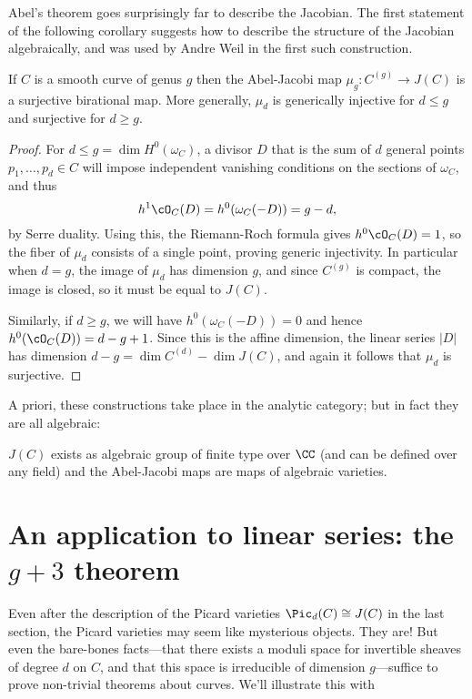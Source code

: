 Abel's theorem goes surprisingly far to describe the Jacobian. The first statement of the following corollary suggests how to describe the structure of the Jacobian algebraically, and was used by Andre Weil in the first such construction.

\begin{corollary}
If $C$ is a smooth curve of genus $g$ then the Abel-Jacobi map $\mu_{g}: C^{(g)} \to J(C)$ is a surjective birational map.
More generally, $\mu_{d}$ is generically injective for $d\leq g$ and surjective for $d\geq g$.
\end{corollary}

\begin{proof}
For $d\leq g = \dim H^{0}(\omega_{C})$,  a divisor $D$ that is the sum of $d$ general points $p_{1}, \dots,  p_{d} \in C$ will impose independent vanishing conditions on the sections of $\omega_{C}$, and thus
$$
h^{1}\cO_{C}(D) = h^0(\omega_C(-D)) = g-d,
$$
by Serre duality. Using this, the Riemann-Roch formula gives $h^{0}\cO_{C}(D) = 1$, so the fiber of 
$\mu_{d}$ consists of a single point, proving generic injectivity. In particular when $d= g$, the image of $\mu_{d}$ has
dimension $g$, and since $C^{(g)}$ is compact, the image is closed, so it must be equal to $J(C)$.

Similarly, if $d \geq g$, we will have $h^0(\omega_C(-D)) = 0$ and hence $h^0(\cO_C(D)) = d-g+1$. Since this is the affine
dimension, the linear series $|D|$ has dimension $d-g = \dim C^{(d)} - \dim J(C)$, and again it follows that
$\mu_{d}$ is surjective.
\end{proof}


A priori, these constructions take place in the analytic category; but in fact they are all algebraic:

\begin{fact}
$J(C)$ exists as algebraic group of finite type over $\CC$ (and can be defined over any field) and the Abel-Jacobi maps are
maps of algebraic varieties.
\end{fact}

\section{An application to linear series: the $g+3$ theorem}

Even after the description of the Picard varieties $\Pic_d(C) \cong J(C)$ in the last section, the Picard varieties may seem like mysterious objects. They are! But even the bare-bones facts---that there exists a  moduli space for invertible sheaves of degree $d$ on $C$, and that this space is irreducible of dimension $g$---suffice to prove non-trivial theorems about curves. We'll illustrate this with 

